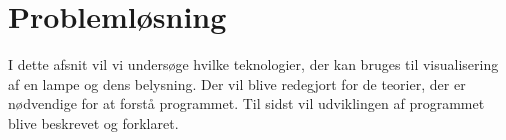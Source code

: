 \section{Problemløsning}
\label{sec:problemlosning}
I dette afsnit vil vi undersøge hvilke teknologier, der kan bruges til visualisering af en lampe og dens belysning. Der vil blive redegjort for de teorier, der er nødvendige for at forstå programmet. Til sidst vil udviklingen af programmet blive beskrevet og forklaret. 


\clearpage

\clearpage



\clearpage